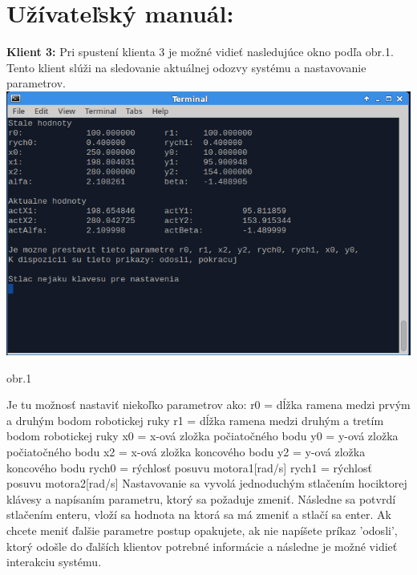 \documentclass{article}
\begin{document}
\section{Užívateľský manuál:}
\textbf{Klient 3:}
Pri spustení klienta 3 je možné vidieť nasledujúce okno podľa obr.1. Tento klient slúži na sledovanie aktuálnej odozvy systému a nastavovanie parametrov. \newline
\includegraphics[width=\linewidth]{client3.png}
\begin{center} obr.1 \end{center}
Je tu možnosť nastaviť niekoľko parametrov ako:\newline
r0 = dĺžka ramena medzi prvým a druhým bodom robotickej ruky\newline
r1 = dĺžka ramena medzi druhým a tretím bodom robotickej ruky\newline
x0 = x-ová zložka počiatočného bodu\newline
y0 = y-ová zložka počiatočného bodu\newline
x2 = x-ová zložka koncového bodu\newline
y2 = y-ová zložka koncového bodu\newline
rych0 = rýchlosť posuvu motora1[rad/s]\newline
rych1 = rýchlosť posuvu motora2[rad/s]\newline
Nastavovanie sa vyvolá jednoduchým stlačením hociktorej klávesy a napísaním parametru, ktorý sa požaduje zmeniť. Následne sa potvrdí stlačením enteru, vloží sa hodnota na ktorá sa má zmeniť a stlačí sa enter. Ak chcete meniť ďalšie parametre postup opakujete, ak nie napíšete príkaz 'odosli', ktorý odošle do ďalších klientov potrebné informácie a následne je možné vidieť interakciu systému.
\end{document}
